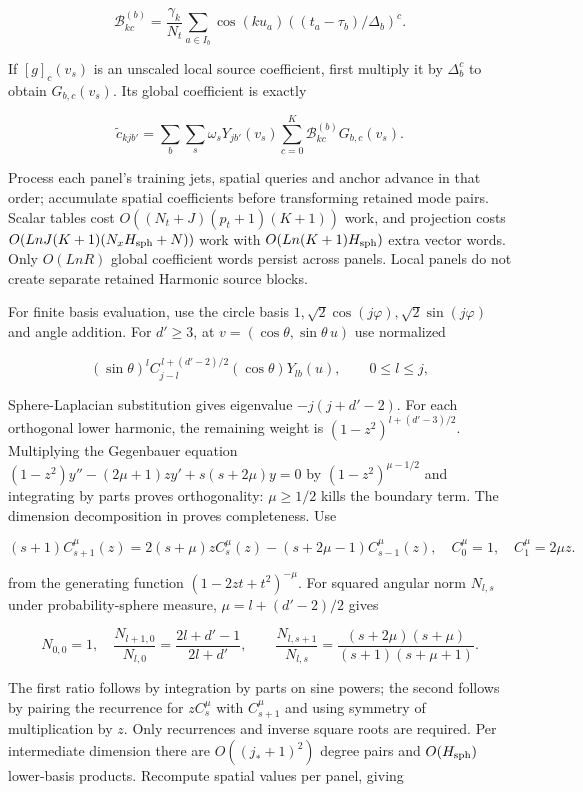 \[
\mathcal B_{kc}^{(b)}=\frac{\gamma_k}{N_t}\sum_{a\in I_b}
 \cos(ku_a)((t_a-\tau_b)/\Delta_b)^c.
\]

If $[g]_c(v_s)$ is an unscaled local source coefficient, first multiply
it by $\Delta_b^c$ to obtain $G_{b,c}(v_s)$. Its global coefficient
is exactly

\begin{equation}
\label{cp:init:eq:streamed-projection}
\widetilde c_{kjb'}=
 \sum_b\sum_s\omega_sY_{jb'}(v_s)
                  \sum_{c=0}^K\mathcal B_{kc}^{(b)}G_{b,c}(v_s).
\end{equation}

Process each panel's training jets, spatial queries and anchor advance
in that order; accumulate spatial coefficients before transforming retained
mode pairs. Scalar tables cost
$O((N_t+J)(p_t+1)(K+1))$ work, and projection costs
$O(LnJ(K+1)(N_xH_{\rm sph}+N))$ work with
$O(Ln(K+1)H_{\rm sph})$ extra vector words. Only $O(LnR)$
global coefficient words persist across panels. Local panels do not
create separate retained Harmonic source blocks.

For finite basis evaluation, use the circle basis
$1,\sqrt2\cos(j\varphi),\sqrt2\sin(j\varphi)$ and angle addition.
For $d'\ge3$, at $v=(\cos\theta,\sin\theta\,u)$ use normalized

\[
(\sin\theta)^l C_{j-l}^{\,l+(d'-2)/2}(\cos\theta)
                       Y_{lb}(u),\qquad 0\le l\le j,
\]

Sphere-Laplacian substitution gives eigenvalue $-j(j+d'-2)$.
For each orthogonal lower harmonic, the remaining weight is
$(1-z^2)^{l+(d'-3)/2}$. Multiplying the Gegenbauer equation
$(1-z^2)y''-(2\mu+1)zy'+s(s+2\mu)y=0$ by
$(1-z^2)^{\mu-1/2}$ and integrating by parts proves orthogonality:
$\mu\ge1/2$ kills the boundary term. The dimension decomposition
in  proves completeness. Use

\[
(s+1)C_{s+1}^{\mu}(z)=2(s+\mu)zC_s^\mu(z)
 -(s+2\mu-1)C_{s-1}^\mu(z),\quad C_0^\mu=1,\quad C_1^\mu=2\mu z.
\]

from the generating function $(1-2zt+t^2)^{-\mu}$.
For squared angular norm $N_{l,s}$ under probability-sphere measure,
$\mu=l+(d'-2)/2$ gives

\[
N_{0,0}=1,\quad
\frac{N_{l+1,0}}{N_{l,0}}=\frac{2l+d'-1}{2l+d'},\qquad
\frac{N_{l,s+1}}{N_{l,s}}=
 \frac{(s+2\mu)(s+\mu)}{(s+1)(s+\mu+1)}.
\]

The first ratio follows by integration by parts on sine powers; the
second follows by pairing the recurrence for $zC_s^\mu$ with
$C_{s+1}^\mu$ and using symmetry of multiplication by $z$.
Only recurrences and inverse square roots are required. Per intermediate
dimension there are $O((j_*+1)^2)$ degree pairs and $O(H_{\rm sph})$
lower-basis products. Recompute spatial values per panel, giving

